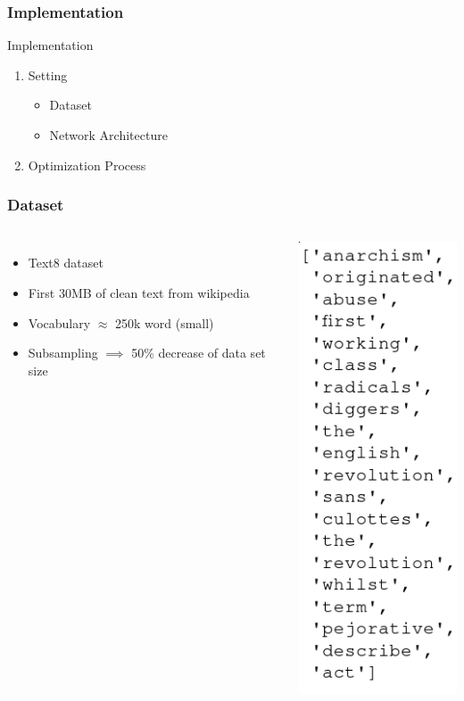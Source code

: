 \begin{frame}\frametitle{Implementation}
\begin{Large}
Implementation
\end{Large}
\begin{enumerate}
\item Setting
\begin{itemize}
\item Dataset 
\item Network Architecture 
\end{itemize}
\item Optimization Process
\end{enumerate}
\end{frame}

\begin{frame}
\frametitle{Dataset} 
\begin{columns}
    \begin{itemize}
\item Text8 dataset
\item First 30MB of clean text from wikipedia 
\item Vocabulary $\approx$ 250k word (small) 
\item Subsampling $\implies$ 50\% decrease of data set size
\end{itemize}
        \includegraphics[scale=0.35]{images/text8snippet}
  \end{columns}
\end{frame}

